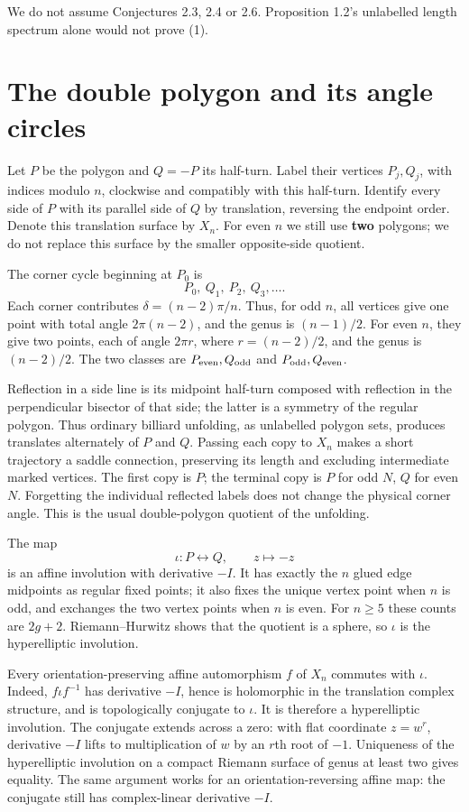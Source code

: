\documentclass[11pt]{article}
\begin{document}
We do not assume Conjectures 2.3, 2.4 or 2.6. Proposition 1.2's unlabelled length spectrum alone would not prove (1).

\section{The double polygon and its angle circles}

Let \(P\) be the polygon and \(Q=-P\) its half-turn. Label their vertices \(P_j,Q_j\), with indices modulo \(n\), clockwise and compatibly with this half-turn. Identify every side of \(P\) with its parallel side of \(Q\) by translation, reversing the endpoint order. Denote this translation surface by \(X_n\). For even \(n\) we still use \textbf{two} polygons; we do not replace this surface by the smaller opposite-side quotient.

The corner cycle beginning at \(P_0\) is
\[
P_0,\ Q_1,\ P_2,\ Q_3,\ldots .
\tag{3}
\]
Each corner contributes \(\delta=(n-2)\pi/n\). Thus, for odd \(n\), all vertices give one point with total angle \(2\pi(n-2)\), and the genus is \((n-1)/2\). For even \(n\), they give two points, each of angle \(2\pi r\), where \(r=(n-2)/2\), and the genus is \((n-2)/2\). The two classes are \(P_{\rm even},Q_{\rm odd}\) and \(P_{\rm odd},Q_{\rm even}\).

Reflection in a side line is its midpoint half-turn composed with reflection in the perpendicular bisector of that side; the latter is a symmetry of the regular polygon. Thus ordinary billiard unfolding, as unlabelled polygon sets, produces translates alternately of \(P\) and \(Q\). Passing each copy to \(X_n\) makes a short trajectory a saddle connection, preserving its length and excluding intermediate marked vertices. The first copy is \(P\); the terminal copy is \(P\) for odd \(N\), \(Q\) for even \(N\). Forgetting the individual reflected labels does not change the physical corner angle. This is the usual double-polygon quotient of the unfolding.

The map
\[
\iota:P\longleftrightarrow Q,\qquad z\longmapsto-z
\tag{4}
\]
is an affine involution with derivative \(-I\). It has exactly the \(n\) glued edge midpoints as regular fixed points; it also fixes the unique vertex point when \(n\) is odd, and exchanges the two vertex points when \(n\) is even. For \(n\ge5\) these counts are \(2g+2\). Riemann--Hurwitz shows that the quotient is a sphere, so \(\iota\) is the hyperelliptic involution.

Every orientation-preserving affine automorphism \(f\) of \(X_n\) commutes with \(\iota\). Indeed, \(f\iota f^{-1}\) has derivative \(-I\), hence is holomorphic in the translation complex structure, and is topologically conjugate to \(\iota\). It is therefore a hyperelliptic involution. The conjugate extends across a zero: with flat coordinate \(z=w^r\), derivative \(-I\) lifts to multiplication of \(w\) by an \(r\)th root of \(-1\). Uniqueness of the hyperelliptic involution on a compact Riemann surface of genus at least two gives equality. The same argument works for an orientation-reversing affine map: the conjugate still has complex-linear derivative \(-I\).
\end{document}

